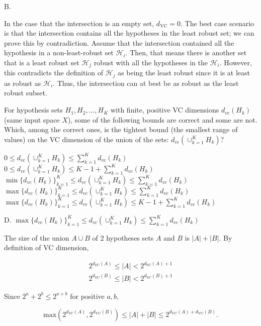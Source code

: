 \documentclass[answers]{exam}
\begin{document}
\begin{questions}
\begin{solution}
B. 

In the case that the intersection is an empty set, $d_{\text{VC}}=0$. The best
case scenario is that the intersection contains all the hypotheses in the 
least robust set; we can prove this by contradiction. Assume that the 
intersection contained all the hypothesis in a non-least-robust set 
$\mathcal{H}_{i}$. Then, that means there is another set that is a least robust
set $\mathcal{H}_{j}$ robust with all the hypotheses in the $\mathcal{H}_{i}$.
However, this contradicts the definition of $\mathcal{H}_{j}$ as being
the least robust since it is at least as robust as $\mathcal{H}_{i}$. Thus,
the intersection can at best be as robust as the least robust subset.
\end{solution}

\question
For hypothesis sets $H_1, H_2, \ldots, H_K$ with finite, positive VC dimensions 
$d_{vc}(H_k)$ (same input space $X$), some of the following bounds are correct 
and some are not. Which, among the correct ones, is the tightest bound (the 
smallest range of values) on the VC dimension of the union of the sets: 
$d_{vc}(\cup_{k=1}^K H_k)$?

\begin{choices}
    \choice $0 \leq d_{vc}(\cup_{k=1}^K H_k) \leq \sum_{k=1}^K d_{vc}(H_k)$
    \choice $0 \leq d_{vc}(\cup_{k=1}^K H_k) \leq K - 1 + \sum_{k=1}^K 
    d_{vc}(H_k)$
    \choice $\min\{d_{vc}(H_k)\}_{k=1}^K \leq d_{vc}(\cup_{k=1}^K H_k) \leq 
    \sum_{k=1}^K d_{vc}(H_k)$
    \choice $\max\{d_{vc}(H_k)\}_{k=1}^K \leq d_{vc}(\cup_{k=1}^K H_k) \leq 
    \sum_{k=1}^K d_{vc}(H_k)$
    \choice $\max\{d_{vc}(H_k)\}_{k=1}^K \leq d_{vc}(\cup_{k=1}^K H_k) \leq 
    K - 1 + \sum_{k=1}^K d_{vc}(H_k)$
\end{choices}

\begin{solution}
D. $\max\{d_{vc}(H_k)\}_{k=1}^K \leq d_{vc}(\cup_{k=1}^K H_k) \leq 
    \sum_{k=1}^K d_{vc}(H_k)$

The size of the union $A \cup B$ of 2 hypotheses sets $A$ and $B$ is
$|A| + |B|$. By definition of VC dimension,

\begin{gather*}
2^{d_{VC}(A)} \le |A| < 2^{d_{VC}(A) + 1} \\ 
2^{d_{VC}(B)} \le |B| < 2^{d_{VC}(B) + 1}
\end{gather*}

Since $2^{a} + 2^{b} \le 2^{a + b}$ for positive $a, b$,

\[
\text{max}(2^{d_{VC}(A)}, 2^{d_{\text{VC}}(B)}) \le |A| + |B| \le 2^{d_{\text{VC}}(A) + d_{\text{VC}}(B)}
.\] 
\end{solution}

\end{questions}
\end{document}

